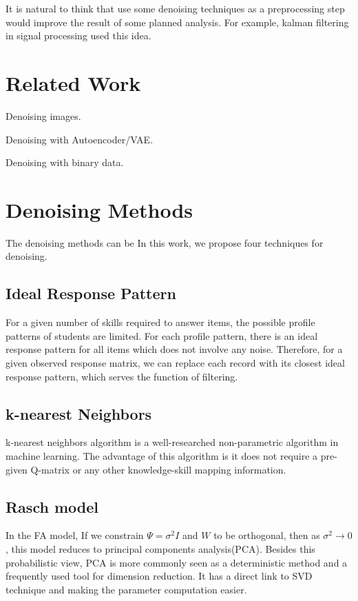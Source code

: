 \documentclass[11pt]{article}
\begin{document}
It is natural to think that use some denoising techniques as a preprocessing step would improve the result of some planned analysis. For example, kalman filtering in signal processing used this idea. 

\section{Related Work}

Denoising images.

Denoising with Autoencoder/VAE. 

Denoising with binary data. 

\section{Denoising Methods}
The denoising methods can be 
In this work, we propose four techniques for denoising. 

\subsection{Ideal Response Pattern}
For a given number of skills required to answer items, the possible profile patterns of students are limited. For each profile pattern, there is an ideal response pattern for all items which does not involve any noise. Therefore, for a given observed response matrix, we can replace each record with its closest ideal response pattern, which serves the function of filtering.

\subsection{k-nearest Neighbors}
k-nearest neighbors algorithm is a well-researched non-parametric algorithm in machine learning. The advantage of this algorithm is it does not require a pre-given Q-matrix or any other knowledge-skill mapping information. 

\subsection{Rasch model}
In the FA model, If we constrain $\Psi=\sigma^2I$ and $W$ to be orthogonal, then as $\sigma^2\rightarrow0$, this model reduces to principal components analysis(PCA)\cite{murphy2012machine}. Besides this probabilistic view, PCA is more commonly seen as a deterministic method and a frequently used tool for dimension reduction. It has a direct link to SVD technique and making the parameter computation easier.
\end{document}
